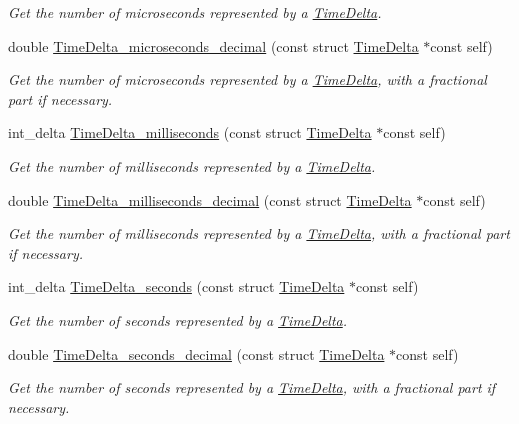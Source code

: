 \begin{DoxyCompactItemize}
\begin{DoxyCompactList}\small\item\em \-Get the number of microseconds represented by a \hyperlink{structTimeDelta}{\-Time\-Delta}. \end{DoxyCompactList}\item 
double \hyperlink{time-delta_8h_a7ded3314113cc38a3bc4034099f11ac1}{\-Time\-Delta\-\_\-microseconds\-\_\-decimal} (const struct \hyperlink{structTimeDelta}{\-Time\-Delta} $\ast$const self)
\begin{DoxyCompactList}\small\item\em \-Get the number of microseconds represented by a \hyperlink{structTimeDelta}{\-Time\-Delta}, with a fractional part if necessary. \end{DoxyCompactList}\item 
int\-\_\-delta \hyperlink{time-delta_8h_a7862999bc76772c28b49e682470c49da}{\-Time\-Delta\-\_\-milliseconds} (const struct \hyperlink{structTimeDelta}{\-Time\-Delta} $\ast$const self)
\begin{DoxyCompactList}\small\item\em \-Get the number of milliseconds represented by a \hyperlink{structTimeDelta}{\-Time\-Delta}. \end{DoxyCompactList}\item 
double \hyperlink{time-delta_8h_ac26e47832931d4fce592fbb6d49248aa}{\-Time\-Delta\-\_\-milliseconds\-\_\-decimal} (const struct \hyperlink{structTimeDelta}{\-Time\-Delta} $\ast$const self)
\begin{DoxyCompactList}\small\item\em \-Get the number of milliseconds represented by a \hyperlink{structTimeDelta}{\-Time\-Delta}, with a fractional part if necessary. \end{DoxyCompactList}\item 
int\-\_\-delta \hyperlink{time-delta_8h_ac63d87ff8c98e5659dd3984b2e4cb180}{\-Time\-Delta\-\_\-seconds} (const struct \hyperlink{structTimeDelta}{\-Time\-Delta} $\ast$const self)
\begin{DoxyCompactList}\small\item\em \-Get the number of seconds represented by a \hyperlink{structTimeDelta}{\-Time\-Delta}. \end{DoxyCompactList}\item 
double \hyperlink{time-delta_8h_ae4690765e21818a97d80b5e5f4334e73}{\-Time\-Delta\-\_\-seconds\-\_\-decimal} (const struct \hyperlink{structTimeDelta}{\-Time\-Delta} $\ast$const self)
\begin{DoxyCompactList}\small\item\em \-Get the number of seconds represented by a \hyperlink{structTimeDelta}{\-Time\-Delta}, with a fractional part if necessary. \end{DoxyCompactList}\item 

\end{DoxyCompactItemize}
